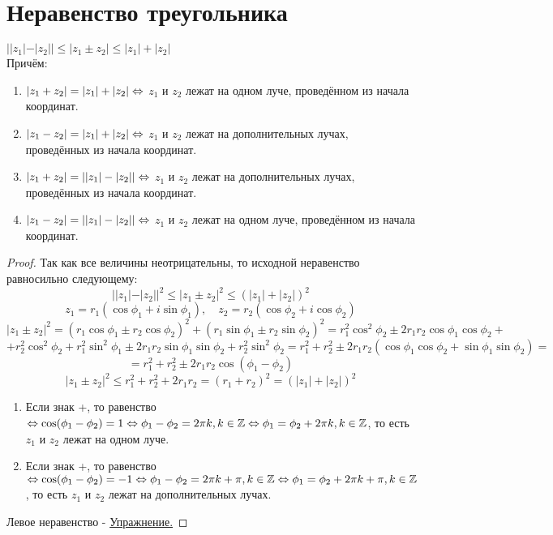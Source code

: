 \section{Неравенство треугольника}

\begin{theorem}{} $||z_1| - |z_2|| \le |z_1 \pm z_2| \le |z_1| + |z_2|$ \\
\hspace*{1cm}Причём:
\begin{enumerate}
	\item $|z_1 + z_2| = |z_1| + |z_2| \Leftrightarrow$ $z_1$ и $z_2$ лежат на одном луче, проведённом из начала координат.
	\item $|z_1 - z_2| = |z_1| + |z_2| \Leftrightarrow$ $z_1$ и $z_2$ лежат на дополнительных лучах, проведённых из начала координат.
	\item $|z_1 + z_2| = ||z_1| - |z_2|| \Leftrightarrow$ $z_1$ и $z_2$ лежат на дополнительных лучах, проведённых из начала координат.
	\item $|z_1 - z_2| = ||z_1| - |z_2|| \Leftrightarrow$ $z_1$ и $z_2$ лежат на одном луче, проведённом из начала координат.
\end{enumerate} 
\end{theorem}
\begin{proof}
Так как все величины неотрицательны, то исходной неравенство равносильно следующему:
$$||z_1|-|z_2||^2 \le |z_1 \pm z_2|^2 \le (|z_1| + |z_2|)^2$$
$$z_1 = r_1(\cos \phi_1 + i \sin \phi_1),\quad z_2 = r_2(\cos \phi_2 + i \cos \phi_2)$$
$$|z_1 \pm z_2|^2 = (r_1 \cos \phi_1 \pm r_2 \cos \phi_2)^2 + (r_1 \sin \phi_1 \pm r_2 \sin \phi_2)^2 = r_1^2 \cos^2 \phi_2 \pm 2r_1r_2 \cos \phi_1 \cos \phi_2 +$$
$$+ r_2^2 \cos^2 \phi_2 + r_1^2 \sin^2 \phi_1 \pm 2r_1r_2 \sin \phi_1 \sin \phi_2 + r_2^2 \sin^2 \phi_2 = r_1^2 + r_2 ^2 \pm 2r_1r_2(\cos \phi_1 \cos \phi_2 + \sin \phi_1 \sin \phi_2) =$$
$$= r_1^2 + r_2^2 \pm 2r_1r_2 \cos(\phi_1 - \phi_2)$$
$$|z_1 \pm z_2|^2 \le r_1^2 + r_2^2 + 2r_1r_2 = (r_1 + r_2)^2 = (|z_1| + |z_2|)^2$$
\begin{enumerate}
	\item Если знак +, то равенство $\Leftrightarrow \cos(\phi_1 - \phi_2) = 1 \Leftrightarrow \phi_1 - \phi_2 = 2 \pi k, k \in \mathbb{Z} \Leftrightarrow \phi_1 = \phi_2 + 2 \pi k, k \in \mathbb{Z}$, то есть $z_1$ и $z_2$ лежат на одном луче.
	\item Если знак +, то равенство $\Leftrightarrow \cos(\phi_1 - \phi_2) = -1 \Leftrightarrow \phi_1 - \phi_2 = 2 \pi k + \pi, k \in \mathbb{Z} \Leftrightarrow \phi_1 = \phi_2 + 2 \pi k + \pi, k \in \mathbb{Z}$, то есть $z_1$ и $z_2$ лежат на дополнительных лучах.
\end{enumerate}
Левое неравенство - \underline{Упражнение.}
\end{proof}